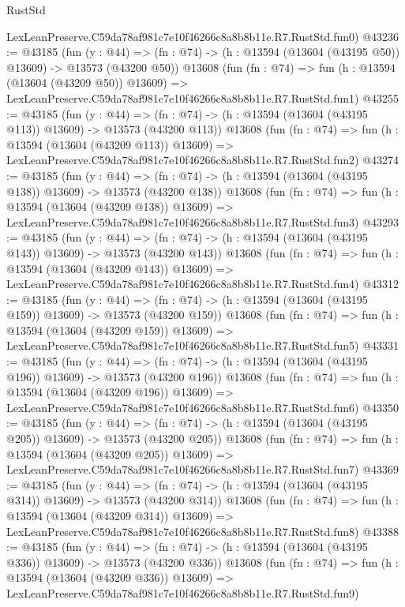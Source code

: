 \begin{lexlean}{RustStd}
\begin{coremodule}
    LexLeanPreserve.C59da78af981c7e10f46266c8a8b8b11e.R7.RustStd.fun0)
@43236 := @43185
    (fun (y : @44) =>
    (fn : @74) -> (h : @13594 (@13604 (@43195 @50)) @13609) -> @13573 (@43200 @50))
    @13608
    (fun (fn : @74) =>
    fun (h : @13594 (@13604 (@43209 @50)) @13609) =>
    LexLeanPreserve.C59da78af981c7e10f46266c8a8b8b11e.R7.RustStd.fun1)
@43255 := @43185
    (fun (y : @44) =>
    (fn : @74) -> (h : @13594 (@13604 (@43195 @113)) @13609) -> @13573 (@43200 @113))
    @13608
    (fun (fn : @74) =>
    fun (h : @13594 (@13604 (@43209 @113)) @13609) =>
    LexLeanPreserve.C59da78af981c7e10f46266c8a8b8b11e.R7.RustStd.fun2)
@43274 := @43185
    (fun (y : @44) =>
    (fn : @74) -> (h : @13594 (@13604 (@43195 @138)) @13609) -> @13573 (@43200 @138))
    @13608
    (fun (fn : @74) =>
    fun (h : @13594 (@13604 (@43209 @138)) @13609) =>
    LexLeanPreserve.C59da78af981c7e10f46266c8a8b8b11e.R7.RustStd.fun3)
@43293 := @43185
    (fun (y : @44) =>
    (fn : @74) -> (h : @13594 (@13604 (@43195 @143)) @13609) -> @13573 (@43200 @143))
    @13608
    (fun (fn : @74) =>
    fun (h : @13594 (@13604 (@43209 @143)) @13609) =>
    LexLeanPreserve.C59da78af981c7e10f46266c8a8b8b11e.R7.RustStd.fun4)
@43312 := @43185
    (fun (y : @44) =>
    (fn : @74) -> (h : @13594 (@13604 (@43195 @159)) @13609) -> @13573 (@43200 @159))
    @13608
    (fun (fn : @74) =>
    fun (h : @13594 (@13604 (@43209 @159)) @13609) =>
    LexLeanPreserve.C59da78af981c7e10f46266c8a8b8b11e.R7.RustStd.fun5)
@43331 := @43185
    (fun (y : @44) =>
    (fn : @74) -> (h : @13594 (@13604 (@43195 @196)) @13609) -> @13573 (@43200 @196))
    @13608
    (fun (fn : @74) =>
    fun (h : @13594 (@13604 (@43209 @196)) @13609) =>
    LexLeanPreserve.C59da78af981c7e10f46266c8a8b8b11e.R7.RustStd.fun6)
@43350 := @43185
    (fun (y : @44) =>
    (fn : @74) -> (h : @13594 (@13604 (@43195 @205)) @13609) -> @13573 (@43200 @205))
    @13608
    (fun (fn : @74) =>
    fun (h : @13594 (@13604 (@43209 @205)) @13609) =>
    LexLeanPreserve.C59da78af981c7e10f46266c8a8b8b11e.R7.RustStd.fun7)
@43369 := @43185
    (fun (y : @44) =>
    (fn : @74) -> (h : @13594 (@13604 (@43195 @314)) @13609) -> @13573 (@43200 @314))
    @13608
    (fun (fn : @74) =>
    fun (h : @13594 (@13604 (@43209 @314)) @13609) =>
    LexLeanPreserve.C59da78af981c7e10f46266c8a8b8b11e.R7.RustStd.fun8)
@43388 := @43185
    (fun (y : @44) =>
    (fn : @74) -> (h : @13594 (@13604 (@43195 @336)) @13609) -> @13573 (@43200 @336))
    @13608
    (fun (fn : @74) =>
    fun (h : @13594 (@13604 (@43209 @336)) @13609) =>
    LexLeanPreserve.C59da78af981c7e10f46266c8a8b8b11e.R7.RustStd.fun9)

\end{coremodule}
\end{lexlean}
